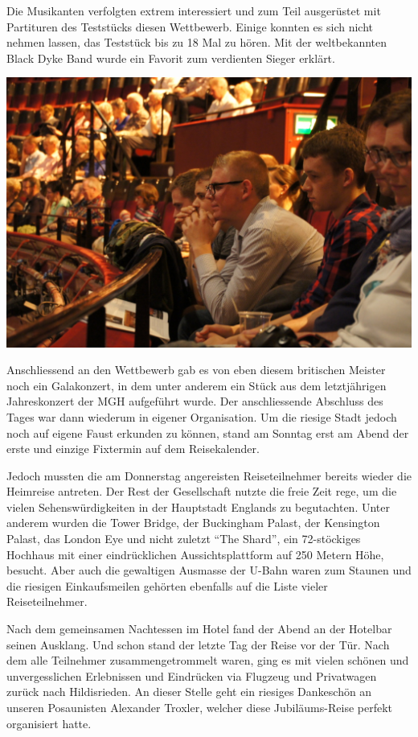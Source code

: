 \begin{history}
    Die Musikanten verfolgten extrem interessiert und zum Teil ausgerüstet mit
    Partituren des Teststücks diesen Wettbewerb. Einige konnten es sich nicht
    nehmen lassen, das Teststück bis zu 18 Mal zu hören. Mit der weltbekannten
    Black Dyke Band wurde ein Favorit zum verdienten Sieger erklärt.

    \begin{MulticolFigure}
        \centering
        \includegraphics[width=0.93\linewidth]{./chap/2001-2024/2014/Britisch-Open-Royal-Alber-Hall.jpg}
    \end{MulticolFigure}

    Anschliessend an den Wettbewerb gab es von eben diesem britischen Meister
    noch ein Galakonzert, in dem unter anderem ein Stück aus dem letztjährigen
    Jahreskonzert der MGH aufgeführt wurde. Der anschliessende Abschluss des
    Tages war dann wiederum in eigener Organisation. Um die riesige Stadt jedoch
    noch auf eigene Faust erkunden zu können, stand am Sonntag erst am Abend der
    erste und einzige Fixtermin auf dem Reisekalender.

    Jedoch mussten die am Donnerstag angereisten Reiseteilnehmer bereits wieder
    die Heimreise antreten. Der Rest der Gesellschaft nutzte die freie Zeit
    rege, um die vielen Sehenswürdigkeiten in der Hauptstadt Englands zu
    begutachten. Unter anderem wurden die Tower Bridge, der Buckingham Palast,
    der Kensington Palast, das London Eye und nicht zuletzt \enquote{The Shard},
    ein 72-stöckiges Hochhaus mit einer eindrücklichen Aussichtsplattform auf
    250 Metern Höhe, besucht. Aber auch die gewaltigen Ausmasse der U-Bahn waren
    zum Staunen und die riesigen Einkaufsmeilen gehörten ebenfalls auf die Liste
    vieler Reiseteilnehmer.

    Nach dem gemeinsamen Nachtessen im Hotel fand der Abend an der Hotelbar
    seinen Ausklang. Und schon stand der letzte Tag der Reise vor der Tür. Nach
    dem alle Teilnehmer zusammengetrommelt waren, ging es mit vielen schönen und
    unvergesslichen Erlebnissen und Eindrücken via Flugzeug und Privatwagen
    zurück nach Hildisrieden. An dieser Stelle geht ein riesiges Dankeschön an
    unseren Posaunisten Alexander Troxler, welcher diese Jubiläums-Reise perfekt
    organisiert hatte.

\end{history}

